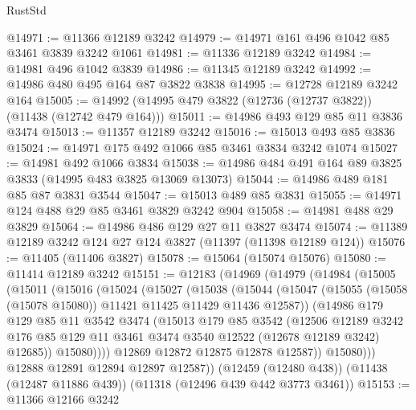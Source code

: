 \begin{lexlean}{RustStd}
\begin{coremodule}
@14971 := @11366 @12189 @3242
@14979 := @14971 @161 @496 @1042 @85 @3461 @3839 @3242 @1061
@14981 := @11336 @12189 @3242
@14984 := @14981 @496 @1042 @3839
@14986 := @11345 @12189 @3242
@14992 := @14986 @480 @495 @164 @87 @3822 @3838
@14995 := @12728 @12189 @3242 @164
@15005 := @14992 (@14995 @479 @3822 (@12736 (@12737 @3822)) (@11438 (@12742 @479 @164)))
@15011 := @14986 @493 @129 @85 @11 @3836 @3474
@15013 := @11357 @12189 @3242
@15016 := @15013 @493 @85 @3836
@15024 := @14971 @175 @492 @1066 @85 @3461 @3834 @3242 @1074
@15027 := @14981 @492 @1066 @3834
@15038 := @14986 @484 @491 @164 @89 @3825 @3833 (@14995 @483 @3825 @13069 @13073)
@15044 := @14986 @489 @181 @85 @87 @3831 @3544
@15047 := @15013 @489 @85 @3831
@15055 := @14971 @124 @488 @29 @85 @3461 @3829 @3242 @904
@15058 := @14981 @488 @29 @3829
@15064 := @14986 @486 @129 @27 @11 @3827 @3474
@15074 := @11389 @12189 @3242 @124 @27 @124 @3827 (@11397 (@11398 @12189 @124))
@15076 := @11405 (@11406 @3827)
@15078 := @15064 (@15074 @15076)
@15080 := @11414 @12189 @3242
@15151 := @12183
    (@14969
      (@14979
        (@14984
          (@15005
            (@15011
              (@15016
                (@15024
                  (@15027
                    (@15038
                      (@15044
                        (@15047
                          (@15055 (@15058 (@15078 @15080)) @11421 @11425 @11429 @11436 @12587))
                        (@14986
                          @179
                          @129
                          @85
                          @11
                          @3542
                          @3474
                          (@15013
                            @179
                            @85
                            @3542
                            (@12506
                              @12189
                              @3242
                              @176
                              @85
                              @129
                              @11
                              @3461
                              @3474
                              @3540
                              @12522
                              (@12678 @12189 @3242)
                              @12685))
                          @15080))))
                  @12869
                  @12872
                  @12875
                  @12878
                  @12587))
              @15080)))
        @12888
        @12891
        @12894
        @12897
        @12587))
    (@12459 (@12480 @438))
    (@11438 (@12487 @11886 @439))
    (@11318 (@12496 @439 @442 @3773 @3461))
@15153 := @11366 @12166 @3242

\end{coremodule}
\end{lexlean}
